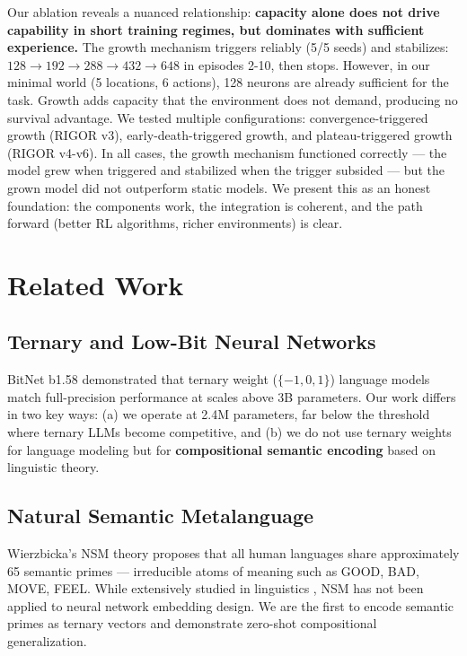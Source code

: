 \documentclass{article}
\begin{document}
Our ablation reveals a nuanced relationship: \textbf{capacity alone does not drive capability in short training regimes, but dominates with sufficient experience.} The growth mechanism triggers reliably (5/5 seeds) and stabilizes: $128\rightarrow192\rightarrow288\rightarrow432\rightarrow648$ in episodes 2-10, then stops. However, in our minimal world (5 locations, 6 actions), 128 neurons are already sufficient for the task. Growth adds capacity that the environment does not demand, producing no survival advantage. We tested multiple configurations: convergence-triggered growth (RIGOR v3), early-death-triggered growth, and plateau-triggered growth (RIGOR v4-v6). In all cases, the growth mechanism functioned correctly --- the model grew when triggered and stabilized when the trigger subsided --- but the grown model did not outperform static models. We present this as an honest foundation: the components work, the integration is coherent, and the path forward (better RL algorithms, richer environments) is clear.

\section{Related Work}

\subsection{Ternary and Low-Bit Neural Networks}
BitNet b1.58 \cite{ma2024era} demonstrated that ternary weight ($\{-1, 0, 1\}$) language models match full-precision performance at scales above 3B parameters. Our work differs in two key ways: (a) we operate at 2.4M parameters, far below the threshold where ternary LLMs become competitive, and (b) we do not use ternary weights for language modeling but for \textbf{compositional semantic encoding} based on linguistic theory.

\subsection{Natural Semantic Metalanguage}
Wierzbicka's NSM theory \cite{wierzbicka1996semantics} proposes that all human languages share approximately 65 semantic primes --- irreducible atoms of meaning such as GOOD, BAD, MOVE, FEEL. While extensively studied in linguistics \cite{goddard2014words, goddard2018ten}, NSM has not been applied to neural network embedding design. We are the first to encode semantic primes as ternary vectors and demonstrate zero-shot compositional generalization.
\end{document}

